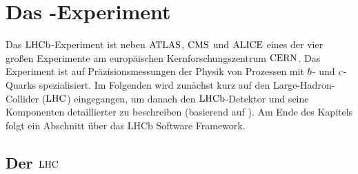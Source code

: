 \chapter{Das \lhcb-Experiment}

Das $\mbox{LHCb}$-Experiment ist neben $\mbox{ATLAS}$, $\mbox{CMS}$ und $\mbox{ALICE}$ eines der vier großen Experimente am europäischen Kernforschungszentrum $\mbox{CERN}$. Das Experiment ist auf Präzisionsmessungen der Physik von Prozessen mit ${b}$- und ${c}$-Quarks spezialisiert. Im Folgenden wird zunächst kurz auf den Large-Hadron-Collider ($\mbox{LHC}$) eingegangen, um danach den $\mbox{LHCb}$-Detektor und seine Komponenten detaillierter zu beschreiben (basierend auf \cite{Alves:2008zz}). Am Ende des Kapitels folgt ein Abschnitt über das LHCb Software Framework.

\section{Der $\mbox{LHC}$}

